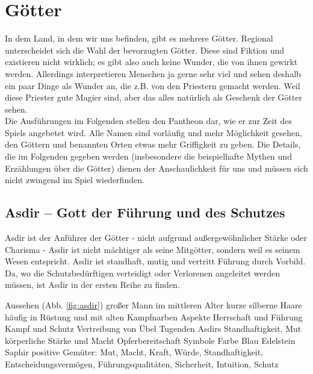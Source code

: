 \section{Götter}
In dem Land, in dem wir uns befinden, gibt es mehrere Götter. 
Regional unterscheidet sich die Wahl der bevorzugten Götter.
Diese sind Fiktion und existieren nicht wirklich; es gibt also auch keine Wunder, die von ihnen gewirkt werden. 
Allerdings interpretieren Menschen ja gerne sehr viel und sehen deshalb ein paar Dinge als Wunder an, die z.B. von den Priestern gemacht werden. 
Weil diese Priester gute Magier sind, aber das alles natürlich als Geschenk der Götter sehen.\\

Die Ausführungen im Folgenden stellen den Pantheon dar, wie er zur Zeit des Spiels angebetet wird.
Alle Namen sind vorläufig und mehr Möglichkeit gesehen, den Göttern und benannten Orten etwas mehr Griffigkeit zu geben.
Die Details, die im Folgenden gegeben werden (insbesondere die beispielhafte Mythen und Erzählungen über die Götter) dienen der Anschaulichkeit für uns und müssen sich nicht zwingend im Spiel wiederfinden.




\subsection{Asdir -- Gott der Führung und des Schutzes}
Asdir ist der Anführer der Götter - nicht aufgrund außergewöhnlicher Stärke oder Charisma - Asdir ist nicht mächtiger als seine Mitgötter, sondern weil es seinem Wesen entspricht. 
Asdir ist standhaft, mutig und vertritt Führung durch Vorbild. 
Da, wo die Schutzbedürftigen verteidigt oder Verlorenen angeleitet werden müssen, ist Asdir in der ersten Reihe zu finden.
\begin{outline}
	\1 Aussehen (Abb. \ref{fig:asdir})
		\2 großer Mann im mittleren Alter
		\2 kurze silberne Haare
		\2 häufig in Rüstung und mit alten Kampfnarben
	\1 Aspekte
		\2 Herrschaft und Führung
		\2 Kampf und Schutz
		\2 Vertreibung von Übel
	\1 Tugenden Asdirs
		\2 Standhaftigkeit, Mut
		\2 körperliche Stärke und Macht
		\2 Opferbereitschaft
	\1 Symbole
		\2 Farbe Blau
		\2 Edelstein Saphir
	\1 positive Gemüter: Mut, Macht, Kraft, Würde, Standhaftigkeit, Entscheidungsvermögen, Führungsqualitäten, Sicherheit, Intuition, Schutz
\end{outline}

